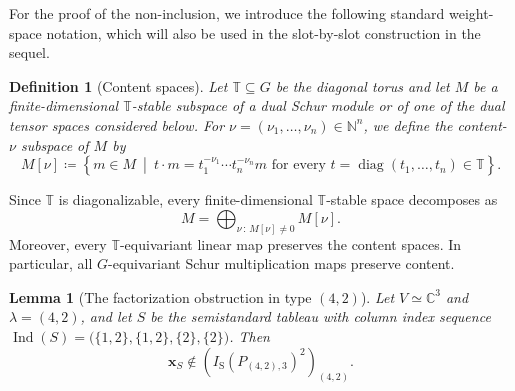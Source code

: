 \documentclass[a4paper,reqno]{amsart}
\theoremstyle{plainnopunct}
\newtheorem{lemma}[lemma]{Lemma}
\theoremstyle{definitionnopunct}
\newtheorem{definition}[definition]{Definition}
\newcommand{\C}{\mathbb{C}}
\newcommand{\N}{\mathbb{N}}
\newcommand{\ind}{\operatorname{Ind}}
\newcommand{\bx}{\mathbf{x}}
\begin{document}
For the proof of the non-inclusion, we introduce the following standard weight-space notation, which will also be used in the slot-by-slot construction in the sequel.

\begin{definition}[Content spaces]
\label{def: content spaces}
Let $\mathbb T\subseteq G$ be the diagonal torus and let $M$ be a finite-dimensional $\mathbb T$-stable subspace of a dual Schur module or of one of the dual tensor spaces considered below. For $\nu=(\nu_1,\ldots,\nu_n)\in\N^n$, we define the \emph{content-$\nu$ subspace} of $M$ by
\[
M[\nu]
\coloneq
\left\{
m\in M
\ \middle|\
t\cdot m
=
t_1^{-\nu_1}\cdots t_n^{-\nu_n}m
\text{ for every }
t=\operatorname{diag}(t_1,\ldots,t_n)\in\mathbb T
\right\}.
\]
\end{definition}

Since $\mathbb T$ is diagonalizable, every finite-dimensional $\mathbb T$-stable space decomposes as
\[
M
=
\bigoplus_{\nu\,:\,M[\nu]\neq0}
M[\nu].
\]
Moreover, every $\mathbb T$-equivariant linear map preserves the content spaces. In particular, all $G$-equivariant Schur multiplication maps preserve content.

\begin{lemma}[The factorization obstruction in type $(4,2)$]
\label{lem: schur square failure 42}
Let $V\simeq\C^3$ and  $\lambda=(4,2)$, and let $S$ be the semistandard tableau with column index sequence $\ind(S)
=
\bigl(
\{1,2\},
\{1,2\},
\{2\},
\{2\}
\bigr)$. Then
\[
\bx_S
\notin
\left(
I_{\mathrm S}(P_{(4,2),3})^2
\right)_{(4,2)}.
\]
\end{lemma}
\end{document}
